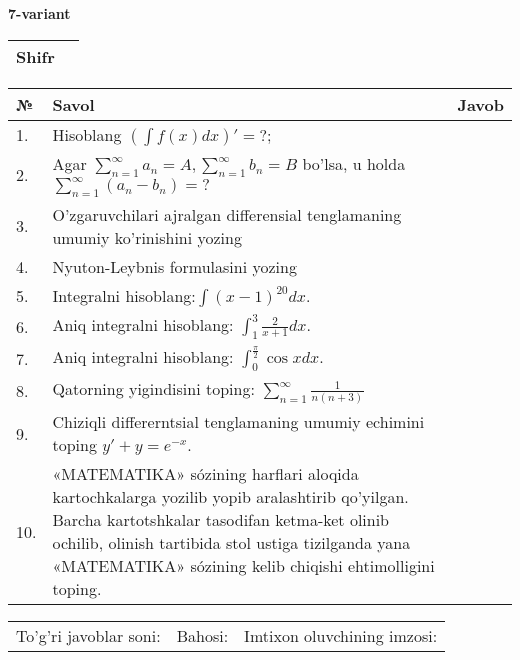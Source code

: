 \documentclass{article}
\begin{document}
  \egroup
  
  \newpage
  
  
  \textbf{7-variant}\\
  
  \bgroup
  \def\arraystretch{1.6} %
  
  \begin{tabular}{|m{5.7cm}|m{9.5cm}|}
  \hline
  Shifr & \\
  \hline
  \end{tabular}
  
  \vspace{1cm}
  
  \begin{tabular}{|m{0.7cm}|m{10cm}|m{4cm}|}
  \hline
  № & Savol & Javob \\
  \hline
  1. & Hisoblang \(\left( \int {f(x)dx} \right)' = ?\); &  \\
  \hline
  2. & Agar \(\sum_{n = 1}^{\infty}a_{n} = A,\sum_{n = 1}^{\infty}b_{n} = B\) bo'lsa, u holda \(\sum_{n = 1}^{\infty}\left( a_{n} - b_{n} \right) = ?\) &  \\
  \hline
  3. & O'zgaruvchilari ajralgan differensial tenglamaning umumiy ko'rinishini yozing &  \\
  \hline
  4. & Nyuton-Leybnis formulasini yozing &  \\
  \hline
  5. & Integralni hisoblang:\(\int {(x - 1)^{20}}dx\). &  \\
  \hline
  6. & Aniq integralni hisoblang: \(\int_{1}^{3}\frac{2}{x + 1}dx\). &  \\
  \hline
  7. & Aniq integralni hisoblang: \(\int_{0}^{\frac{\pi}{2}}{\cos xdx}\). &  \\
  \hline
  8. & Qatorning yigindisini toping: \(\sum_{n = 1}^{\infty}\frac{1}{n(n + 3)}\) &  \\
  \hline
  9. & Chiziqli differerntsial tenglamaning umumiy echimini toping \(y' + y = e^{- x}\). &  \\
  \hline
  10. & «MATEMATIKA» sózining harflari aloqida kartochkalarga yozilib yopib aralashtirib qo'yilgan. Barcha kartotshkalar tasodifan ketma-ket olinib ochilib, olinish tartibida stol ustiga tizilganda yana «MATEMATIKA» sózining kelib chiqishi ehtimolligini toping. &  \\
  \hline
  \end{tabular}
  
  \vspace{1cm}
  
  \begin{tabular}{lll}
  To'g'ri javoblar soni: \underline{\hspace{1.5cm}} & 
  Bahosi: \underline{\hspace{1.5cm}} & 
  Imtixon oluvchining imzosi: \underline{\hspace{2cm}} \\
  \end{tabular}
  
\end{document}
